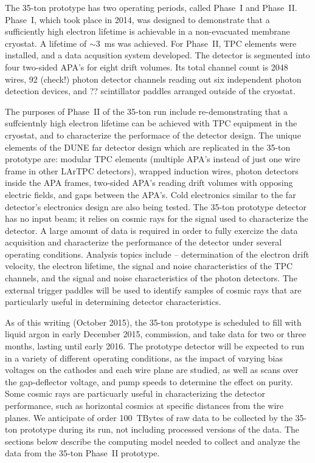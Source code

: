 \label{sec:35t}

The 35-ton prototype has two operating periods, called Phase~I and Phase~II.  Phase~I, which took place
in 2014, was designed to demonstrate that a sufficiently high electron lifetime is achievable in a non-evacuated
membrane cryostat. A lifetime of $\sim$3~ms was achieved.  For Phase~II, TPC elements were installed, and
a data acqusition system developed.  The detector is segmented into four two-sided APA's for eight drift volumes.
Its total channel count is 2048 wires, 92 (check!) photon detector channels reading out six independent photon
detection devices, and ?? scintillator paddles arranged outside of the cryostat.

The purposes of Phase~II of the 35-ton run include re-demonstrating that a suffcientnly high electron
lifetime can be achieved with TPC equipment in the cryostat, and to characterize the performace of the
detector design.  The unique elements of the DUNE far detector design which are replicated in the 35-ton
prototype are:  modular TPC elements (multiple APA's instead of just one wire frame in other LArTPC 
detectors), wrapped induction wires, photon detectors inside the APA frames, two-sided APA's reading
drift volumes with opposing electric fields, and gaps between the APA's.  Cold electronics similar to the
far detector's electronics design are also being tested.  The 35-ton prototype detector has no
input beam; it relies on cosmic rays for the signal used to characterize the detector.  A large amount
of data is required in order to fully exercize the data acquisition and characterize the 
performance of the detector under several operating conditions.  Analysis topics include --
determination of the electron drift velocity, the electron lifetime, the signal and noise characteristics
of the TPC channels, and the signal and noise characteristics of the photon detectors.  The external
trigger paddles will be used to identify samples of cosmic rays that are particularly useful in determining
detector characteristics.

As of this writing (October 2015), the 35-ton prototype is scheduled to fill with liquid argon
in early December 2015, commission, and take data for two or three months, lasting until early 2016.
The prototype detector will be expected to run in a variety of different operating conditions, as
the impact of varying bias voltages on the cathodes and each wire plane are studied, as well as
scans over the gap-deflector voltage, and pump speeds to determine the effect on purity.  Some cosmic
rays are particuarly useful in characterizing the detector performance, such as horizontal cosmics
at specific distances from the wire planes.  We anticipate of order 100~TBytes of raw data to be collected
by the 35-ton prototype during its run, not including processed versions of the data.
The sections below describe the computing model needed
to collect and analyze the data from the 35-ton Phase~II prototype.

